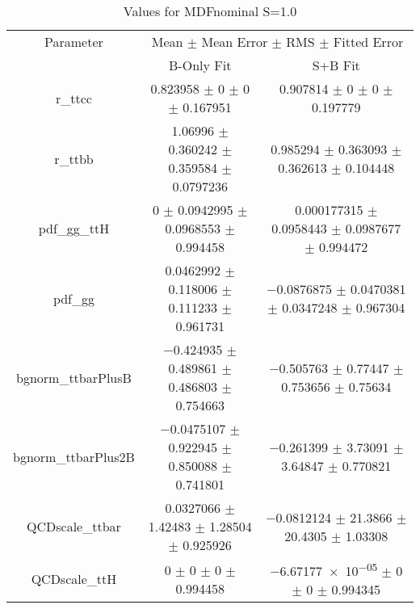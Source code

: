 \begin{table}
\centering
\caption{Values for MDFnominal S=1.0}
\begin{tabular}{ccc}
\toprule
Parameter & \multicolumn{2}{c}{Mean $\pm$ Mean Error $\pm$ RMS $\pm$ Fitted Error}\\
 & B-Only Fit & S+B Fit\\
\midrule
r\_ttcc & \num{0.823958} $\pm$ \num{0} $\pm$ \num{0} $\pm$ \num{0.167951} & \num{0.907814} $\pm$ \num{0} $\pm$ \num{0} $\pm$ \num{0.197779}\\
r\_ttbb & \num{1.06996} $\pm$ \num{0.360242} $\pm$ \num{0.359584} $\pm$ \num{0.0797236} & \num{0.985294} $\pm$ \num{0.363093} $\pm$ \num{0.362613} $\pm$ \num{0.104448}\\
pdf\_gg\_ttH & \num{0} $\pm$ \num{0.0942995} $\pm$ \num{0.0968553} $\pm$ \num{0.994458} & \num{0.000177315} $\pm$ \num{0.0958443} $\pm$ \num{0.0987677} $\pm$ \num{0.994472}\\
pdf\_gg & \num{0.0462992} $\pm$ \num{0.118006} $\pm$ \num{0.111233} $\pm$ \num{0.961731} & \num{-0.0876875} $\pm$ \num{0.0470381} $\pm$ \num{0.0347248} $\pm$ \num{0.967304}\\
bgnorm\_ttbarPlusB & \num{-0.424935} $\pm$ \num{0.489861} $\pm$ \num{0.486803} $\pm$ \num{0.754663} & \num{-0.505763} $\pm$ \num{0.77447} $\pm$ \num{0.753656} $\pm$ \num{0.75634}\\
bgnorm\_ttbarPlus2B & \num{-0.0475107} $\pm$ \num{0.922945} $\pm$ \num{0.850088} $\pm$ \num{0.741801} & \num{-0.261399} $\pm$ \num{3.73091} $\pm$ \num{3.64847} $\pm$ \num{0.770821}\\
QCDscale\_ttbar & \num{0.0327066} $\pm$ \num{1.42483} $\pm$ \num{1.28504} $\pm$ \num{0.925926} & \num{-0.0812124} $\pm$ \num{21.3866} $\pm$ \num{20.4305} $\pm$ \num{1.03308}\\
QCDscale\_ttH & \num{0} $\pm$ \num{0} $\pm$ \num{0} $\pm$ \num{0.994458} & \num{-6.67177e-05} $\pm$ \num{0} $\pm$ \num{0} $\pm$ \num{0.994345}\\
\bottomrule
\end{tabular}
\end{table}